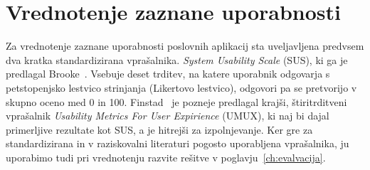 \section{Vrednotenje zaznane uporabnosti}
\label{sec:vrednotenje-uporabnosti}

Za vrednotenje zaznane uporabnosti poslovnih aplikacij sta uveljavljena predvsem dva kratka standardizirana vprašalnika. \textit{System Usability Scale} (SUS), ki ga je predlagal Brooke~\cite{brooke1996sus}. Vsebuje deset trditev, na katere uporabnik odgovarja s petstopenjsko lestvico strinjanja (Likertovo lestvico), odgovori pa se pretvorijo v skupno oceno med 0 in 100. Finstad~\cite{finstad2010umux} je pozneje predlagal krajši, štiritrditveni vprašalnik \textit{Usability Metrics For User Expirience} (UMUX), ki naj bi dajal primerljive rezultate kot SUS, a je hitrejši za izpolnjevanje. Ker gre za standardizirana in v raziskovalni literaturi pogosto uporabljena vprašalnika, ju uporabimo tudi pri vrednotenju razvite rešitve v poglavju~\ref{ch:evalvacija}.
